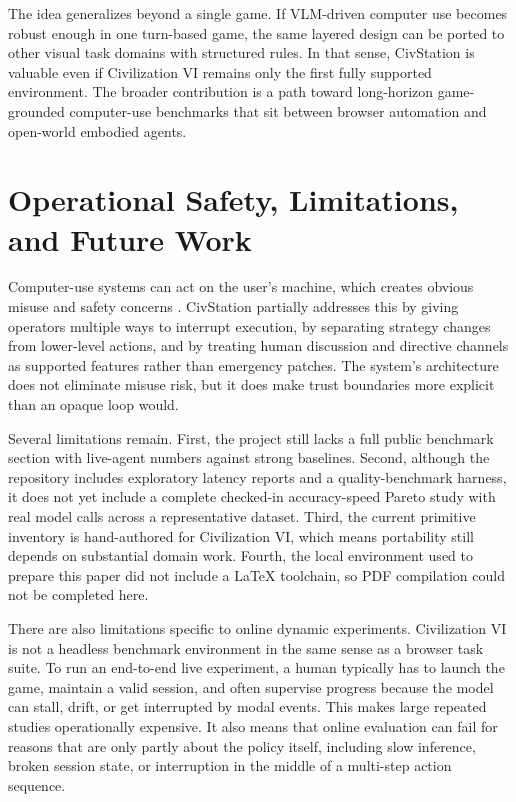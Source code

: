 The idea generalizes beyond a single game. If VLM-driven computer use becomes robust enough in one turn-based game, the same layered design can be ported to other visual task domains with structured rules. In that sense, CivStation is valuable even if Civilization VI remains only the first fully supported environment. The broader contribution is a path toward long-horizon game-grounded computer-use benchmarks that sit between browser automation and open-world embodied agents.

\section{Operational Safety, Limitations, and Future Work}

Computer-use systems can act on the user's machine, which creates obvious misuse and safety concerns \cite{anthropic_computer_use}. CivStation partially addresses this by giving operators multiple ways to interrupt execution, by separating strategy changes from lower-level actions, and by treating human discussion and directive channels as supported features rather than emergency patches. The system's architecture does not eliminate misuse risk, but it does make trust boundaries more explicit than an opaque loop would.

Several limitations remain. First, the project still lacks a full public benchmark section with live-agent numbers against strong baselines. Second, although the repository includes exploratory latency reports and a quality-benchmark harness, it does not yet include a complete checked-in accuracy-speed Pareto study with real model calls across a representative dataset. Third, the current primitive inventory is hand-authored for Civilization VI, which means portability still depends on substantial domain work. Fourth, the local environment used to prepare this paper did not include a LaTeX toolchain, so PDF compilation could not be completed here.

There are also limitations specific to online dynamic experiments. Civilization VI is not a headless benchmark environment in the same sense as a browser task suite. To run an end-to-end live experiment, a human typically has to launch the game, maintain a valid session, and often supervise progress because the model can stall, drift, or get interrupted by modal events. This makes large repeated studies operationally expensive. It also means that online evaluation can fail for reasons that are only partly about the policy itself, including slow inference, broken session state, or interruption in the middle of a multi-step action sequence.

